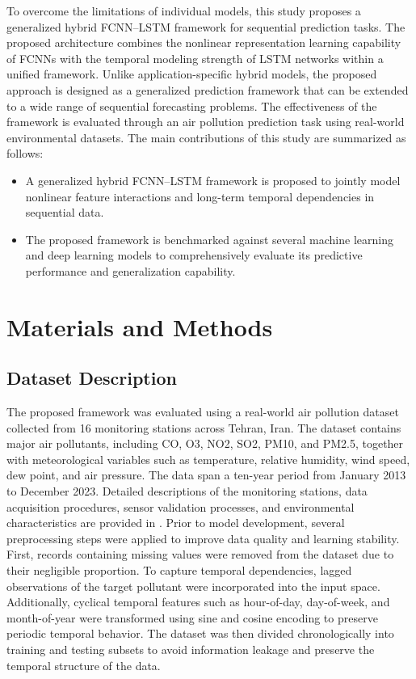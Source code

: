 \documentclass[twoside]{article}
\begin{document}
To overcome the limitations of individual models, this study proposes a generalized hybrid FCNN–LSTM framework for sequential prediction tasks. The proposed architecture combines the nonlinear representation learning capability of FCNNs with the temporal modeling strength of LSTM networks within a unified framework. Unlike application-specific hybrid models, the proposed approach is designed as a generalized prediction framework that can be extended to a wide range of sequential forecasting problems. The effectiveness of the framework is evaluated through an air pollution prediction task using real-world environmental datasets.
The main contributions of this study are summarized as follows:
\begin{itemize}
    \item A generalized hybrid FCNN–LSTM framework is proposed to jointly model nonlinear feature interactions and long-term temporal dependencies in sequential data.
    \item The proposed framework is benchmarked against several machine learning and deep learning models to comprehensively evaluate its predictive performance and generalization capability.
\end{itemize}

\section{Materials and Methods}
\subsection{Dataset Description}

The proposed framework was evaluated using a real-world air pollution dataset collected from 16 monitoring stations across Tehran, Iran. The dataset contains major air pollutants, including CO, O3, NO2, SO2, PM10, and PM2.5, together with meteorological variables such as temperature, relative humidity, wind speed, dew point, and air pressure. The data span a ten-year period from January 2013 to December 2023. Detailed descriptions of the monitoring stations, data acquisition procedures, sensor validation processes, and environmental characteristics are provided in \cite{LZ3}.
Prior to model development, several preprocessing steps were applied to improve data quality and learning stability. First, records containing missing values were removed from the dataset due to their negligible proportion. To capture temporal dependencies, lagged observations of the target pollutant were incorporated into the input space. Additionally, cyclical temporal features such as hour-of-day, day-of-week, and month-of-year were transformed using sine and cosine encoding to preserve periodic temporal behavior. The dataset was then divided chronologically into training and testing subsets to avoid information leakage and preserve the temporal structure of the data.
\end{document}
